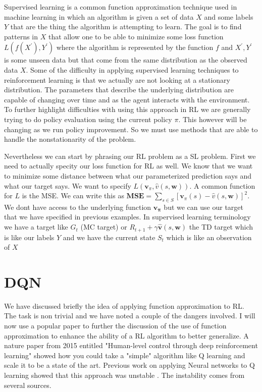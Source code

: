 Supervised learning is a common function approximation technique used in machine learning in which an algorithm is given a set of data $X$ and some labels $Y$ that are the thing the algorithm is attempting to learn. The goal is to find patterns in $X$ that allow one to be able to minimize some loss function $L(f(X^{'}),Y^{'})$ where the algorithm is represented by the function $f$ and $X^{'},Y^{'}$ is some unseen data but that come from the same distribution as the observed data $X$. Some of the difficulty in applying supervised learning techniques to reinforcement learning is that we actually are not looking at a stationary distribution. The parameters that describe the underlying distribution are capable of changing over time and as the agent interacts with the environment. To further highlight difficulties with using this approach in RL we are generally trying to do policy evaluation  using the current policy $\pi$. This however will be changing as we run policy improvement. So we must use methods that are able to handle the nonstationarity of the problem. 

Nevertheless we can start by phrasing our RL problem as a SL problem. First we need to actually specity our loss function for RL as well. We know that we want to minimize some distance between what our parameterized prediction says and what our target says. We want to specify $L (\mathbf{v}_{\pi},\hat{v}(s,\mathbf{w}))$. A common function for $L$ is the MSE. We can write this as $\mathbf{MSE} = \sum_{s \in S} [\mathbf{v}_{\pi}(s) - \hat{v}(s,\mathbf{w})]^{2}$. We dont have access to the underlying function $\mathbf{v_{\pi}}$ but we can use our target that we have specified in previous examples. In supervised learning terminology we have a target like $G_{t}$ (MC target) or $ R_{t + 1} + \gamma \hat{\mathbf{v}}(s,\mathbf{w})$ the TD target which is like our labels $Y$ and we have the current state $S_{t}$ which is like an observation of $X$

\section{DQN}

We have discussed briefly the idea of applying function approximation to RL. The task is non trivial and we have noted a couple of the dangers involved. I will now use a popular paper to further the discussion of the use of function approximation to enhance the ability of a RL algorithm to better generalize. A nature paper from 2015 entitled "Human-level control through deep reinforcement learning" \cite{dqn} showed how you could take a "simple" algorithm like Q learning and scale it to be a state of the art. Previous work on applying Neural networks to Q learning showed that this approach was unstable \cite{nfq}. The instability comes from several sources. 

